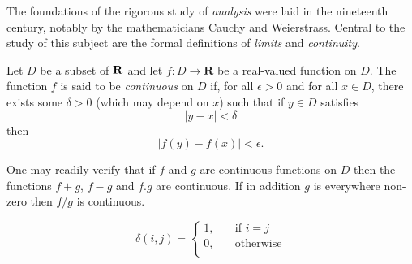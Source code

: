 \documentclass[a4paper,12pt]{article}
\begin{document}
The foundations of the rigorous study of \emph{analysis}
were laid in the nineteenth century, notably by the
mathematicians Cauchy and Weierstrass. Central to the
study of this subject are the formal definitions of
\emph{limits} and \emph{continuity}.

Let $D$ be a subset of $\bf R$ and let
$f \colon D \to \mathbf{R}$ be a real-valued function on
$D$. The function $f$ is said to be \emph{continuous} on
$D$ if, for all $\epsilon > 0$ and for all $x \in D$,
there exists some $\delta > 0$ (which may depend on $x$)
such that if $y \in D$ satisfies
\[ |y - x| < \delta \]
then
\[ |f(y) - f(x)| < \epsilon. \]

One may readily verify that if $f$ and $g$ are continuous
functions on $D$ then the functions $f+g$, $f-g$ and
$f.g$ are continuous. If in addition $g$ is everywhere
non-zero then $f/g$ is continuous.

$$
\delta(i,j)=
\begin{cases}
1, & \quad \text{if } i=j\\
0, & \quad \text{otherwise}\\
\end{cases}
$$
\end{document}
